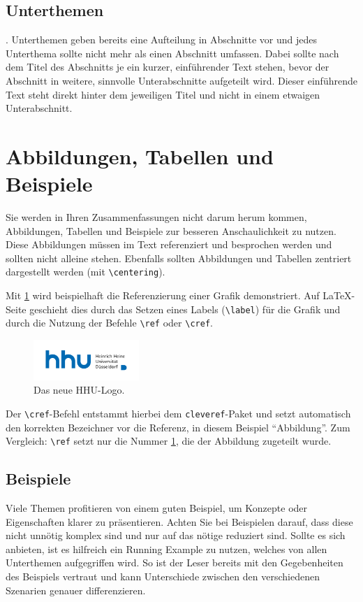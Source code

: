 \documentclass{hhuarticle}
\theoremstyle{definition}
\theoremstyle{theorem}
\begin{document}
  \subsection{Unterthemen}.
  Unterthemen geben bereits eine Aufteilung in Abschnitte vor und jedes
  Unterthema sollte nicht mehr als einen Abschnitt umfassen.
  Dabei sollte nach dem Titel des Abschnitts je ein
  kurzer, einführender Text stehen, bevor der Abschnitt in weitere,
  sinnvolle Unterabschnitte aufgeteilt wird.
  Dieser einführende Text steht direkt hinter dem jeweiligen Titel und
  nicht in einem etwaigen Unterabschnitt.


  \section{Abbildungen, Tabellen und Beispiele}

  Sie werden in Ihren Zusammenfassungen nicht darum herum kommen,
  Abbildungen, Tabellen und Beispiele zur besseren Anschaulichkeit zu nutzen.
  Diese Abbildungen müssen im Text referenziert und besprochen werden
  und sollten nicht alleine stehen.
  Ebenfalls sollten Abbildungen und Tabellen zentriert dargestellt werden
  (mit \texttt{\textbackslash centering}).

  Mit \cref{fig:initial-draft} wird beispielhaft die Referenzierung einer Grafik
  demonstriert.
  Auf \LaTeX-Seite geschieht dies durch das Setzen eines Labels
  (\texttt{\textbackslash label}) für die Grafik
  und durch die Nutzung der Befehle
  \texttt{\textbackslash ref} oder \texttt{\textbackslash cref}.

  \begin{figure}[h]
    \centering
    \includegraphics[width=4cm]{fig/hhulogo.pdf}
    \caption{Das neue HHU-Logo.}%
    \label{fig:initial-draft}
  \end{figure}

  Der \texttt{\textbackslash cref}-Befehl entstammt hierbei dem
  \texttt{cleveref}-Paket und setzt automatisch den korrekten Bezeichner
  vor die Referenz, in diesem Beispiel ``Abbildung''.
  Zum Vergleich: \texttt{\textbackslash ref} setzt nur die
  Nummer \ref{fig:initial-draft}, die der Abbildung zugeteilt wurde.

  \subsection{Beispiele}
  Viele Themen profitieren von einem guten Beispiel,
  um Konzepte oder Eigenschaften klarer zu präsentieren.
  Achten Sie bei Beispielen darauf,
  dass diese nicht unnötig komplex sind und nur auf das nötige reduziert sind.
  Sollte es sich anbieten, ist es hilfreich ein Running Example zu nutzen,
  welches von allen Unterthemen aufgegriffen wird.
  So ist der Leser bereits mit den Gegebenheiten des Beispiels vertraut
  und kann Unterschiede zwischen den verschiedenen Szenarien genauer
  differenzieren.
\end{document}
